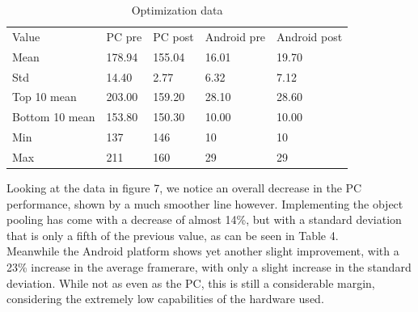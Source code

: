 \begin{table}
\caption{Optimization data}
\label{tab:conf}
\begin{minipage}{0.49\textwidth}
\begin{center}
\begin{tabular}{lllll}
Value & PC pre & PC post & Android pre & Android post \\
Mean & 178.94 & 155.04 & 16.01 & 19.70 \\
Std & 14.40 & 2.77 & 6.32 & 7.12 \\
Top 10 mean & 203.00 & 159.20 & 28.10 & 28.60 \\
Bottom 10 mean & 153.80 & 150.30 & 10.00 & 10.00 \\
Min & 137 & 146 & 10 & 10 \\
Max & 211 & 160 & 29 & 29 
\end{tabular}
\bigskip
\end{center} 
\end{minipage}
\end{table}
Looking at the data in figure 7, we notice an overall decrease in the PC performance, shown by a much smoother line however. Implementing the object pooling has come with a decrease of almost 14\%, but with a standard deviation that is only a fifth of the previous value, as can be seen in Table 4.\\
 Meanwhile the Android platform shows yet another slight improvement, with a 23\% increase in the average framerare, with only a slight increase in the standard deviation. While not as even as the PC, this is still a considerable margin, considering the extremely low capabilities of the hardware used. 
